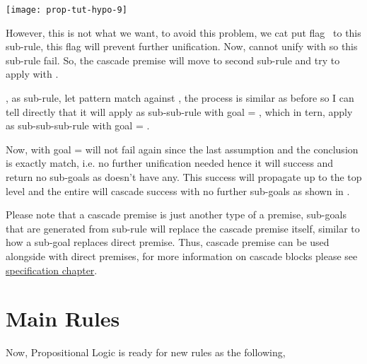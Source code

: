 \documentclass[master.tex]{subfiles}
\begin{document}
\begin{center}
\texttt{[image: prop-tut-hypo-9]}
\end{center}

However, this is not what we want, to avoid this problem, we cat put flag
\kExactMatch\ to this sub-rule, this flag will prevent further unification. Now,
 cannot unify with  so this sub-rule
fail. So, the cascade premise will move to second sub-rule and try to apply
 with .

, as sub-rule, let  pattern match
against , the process is similar as before so I can tell
directly that it will apply  as sub-sub-rule with goal =
, which in tern, apply  as
sub-sub-sub-rule with goal = .

Now,  with goal =  will not fail
again since the last assumption and the conclusion is exactly match, i.e. no
further unification needed hence it will success and return no sub-goals as
 doesn't have any. This success will propagate up to the
top level and the entire will cascade success with no further sub-goals as shown
in .

Please note that a cascade premise is just another type of a premise, sub-goals
that are generated from sub-rule will replace the cascade premise itself,
similar to how a sub-goal replaces direct premise. Thus, cascade premise can be
used alongside with direct premises, for more information on cascade blocks
please see \hyperref[chap:specification]{specification chapter}.

\hspace{2ex}

\section{Main Rules}

Now, Propositional Logic is ready for new rules as the following,
\end{document}
